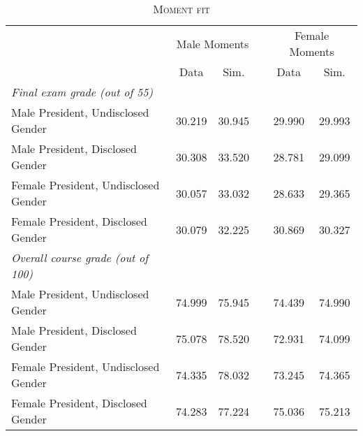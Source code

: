 \documentclass[12pt]{article}
\begin{document}
\restoregeometry
\thispagestyle{empty}\begin{table}[htbp]
\caption{\textsc{Moment fit}}\label{table:fit}
\centering
\begin{tabular}{lccccc}
\hline
\hline
\multicolumn{1}{c}{} & \multicolumn{2}{c}{Male Moments} &  & \multicolumn{2}{c}{Female Moments}\tabularnewline
\cline{2-6}
\multicolumn{1}{c}{} & Data  & Sim.  &  & Data  & Sim. \tabularnewline
\hline

 \textit{Final exam grade (out of 55)} &  & &  &  & \tabularnewline
\hspace{0.4cm}Male President, Undisclosed Gender & 30.219 & 30.945 & {} & 29.990 & 29.993 \\
    \hspace{0.4cm}Male President, Disclosed Gender & 30.308 & 33.520 & {} & 28.781 & 29.099 \\
\hspace{0.4cm}Female President, Undisclosed Gender & 30.057 & 33.032 & {} & 28.633 & 29.365 \\
  \hspace{0.4cm}Female President, Disclosed Gender & 30.079 & 32.225 & {} & 30.869 & 30.327 \\
 \textit{Overall course grade (out of 100)} &  & &  &  & \tabularnewline
\hspace{0.4cm}Male President, Undisclosed Gender & 74.999 & 75.945 & {} & 74.439 & 74.990 \\
    \hspace{0.4cm}Male President, Disclosed Gender & 75.078 & 78.520 & {} & 72.931 & 74.099 \\
\hspace{0.4cm}Female President, Undisclosed Gender & 74.335 & 78.032 & {} & 73.245 & 74.365 \\
  \hspace{0.4cm}Female President, Disclosed Gender & 74.283 & 77.224 & {} & 75.036 & 75.213 \\
\hline
\end{tabular}

\end{table}
\end{document}
